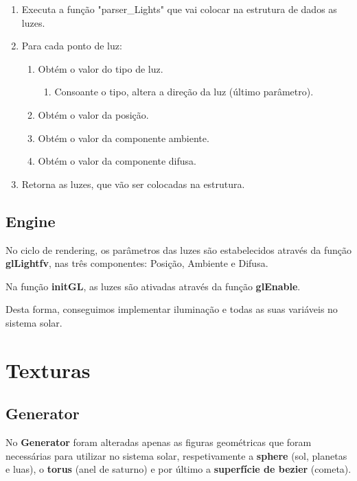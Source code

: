 \documentclass[a4paper]{article}
\begin{document}
\ttfamily
\begin{enumerate}
  \item Executa a função "parser\_Lights" que vai colocar na estrutura de dados as luzes.
  \item Para cada ponto de luz:
  \begin{enumerate}
    \item Obtém o valor do tipo de luz.
		\begin{enumerate}
			\item Consoante o tipo, altera a direção da luz (último parâmetro).
		\end{enumerate}
		\item Obtém o valor da posição.
		\item Obtém o valor da componente ambiente.
		\item Obtém o valor da componente difusa.
		\end{enumerate}
  	\item Retorna as luzes, que vão ser colocadas na estrutura.
\end{enumerate}
\rmfamily


\subsection{Engine}
\label{sec:enginei}

No ciclo de rendering, os parâmetros das luzes são estabelecidos através da função \textbf{glLightfv}, nas três componentes: Posição, Ambiente e Difusa.

Na função \textbf{initGL}, as luzes são ativadas através da função \textbf{glEnable}.

Desta forma, conseguimos implementar iluminação e todas as suas variáveis no sistema solar.

\section{Texturas}
\label{sec:texturas}

\subsection{Generator}
\label{sec:generatort}

No \textbf{Generator} foram alteradas apenas as figuras geométricas que foram necessárias para utilizar no sistema solar, respetivamente a \textbf{sphere} (sol, planetas e luas), o \textbf{torus} (anel de saturno) e por último a \textbf{superfície de bezier} (cometa).
\end{document}
